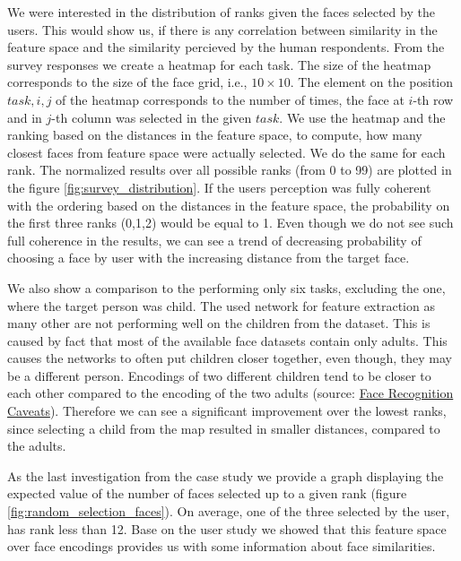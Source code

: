 We were interested in the distribution of ranks given the faces selected by the users. This would show us, if there is any correlation between similarity in the feature space and the similarity percieved by the human respondents. From the survey responses we create a heatmap for each task. The size of the heatmap corresponds to the size of the face grid, i.e., $10\times10$. The element on the position $task, i, j$ of the heatmap corresponds to the number of times, the face at $i$-th row and in $j$-th column was selected in the given $task$. We use the heatmap and the ranking based on the distances in the feature space, to compute, how many closest faces from feature space were actually selected. We do the same for each rank. The normalized results over all possible ranks (from 0 to 99) are plotted in the figure \ref{fig:survey_distribution}. If the users perception was fully coherent with the ordering based on the distances in the feature space, the  
probability on the first three ranks (0,1,2) would be equal to 1. Even though we do not see such full coherence in the results, we can see a trend of decreasing probability of choosing a face by user with the increasing distance from the target face.

We also show a comparison to the performing only six tasks, excluding the one, where the target person was child. The used network for feature extraction as many other are not performing well on the children from the dataset. This is caused by fact that most of the available face datasets contain only adults. This causes the networks to often put children closer together, even though, they may be a different person. Encodings of two different children tend to be closer to each other compared to the encoding of the two adults (source: \href{https://face-recognition.readthedocs.io/en/latest/readme.html#caveats}{Face Recognition Caveats}). Therefore we can see a significant improvement over the lowest ranks, since selecting a child from the map resulted in smaller distances, compared to the adults.

As the last investigation from the case study we provide a graph displaying the expected value of the number of faces selected up to a given rank (figure \ref{fig:random_selection_faces}). On average, one of the three selected by the user, has rank less than 12. Base on the user study we showed that this feature space over face encodings provides us with some information about face similarities.


